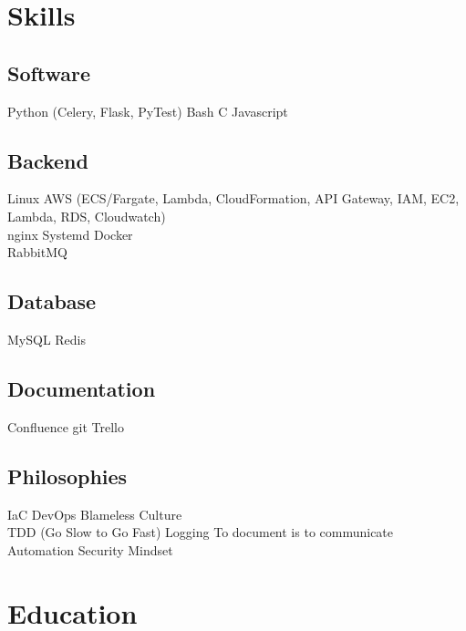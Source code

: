 \documentclass[]{deedy-resume-openfont}
\begin{document}
\begin{minipage}[t]{0.30\textwidth} 


\section{Skills}
\subsection{Software}
Python (Celery, Flask, PyTest) \textbullet{} Bash \textbullet{} C \textbullet{} Javascript 
\\
\subsection{Backend}
Linux \textbullet{} AWS (ECS/Fargate, Lambda, CloudFormation, API Gateway, IAM, EC2, Lambda, RDS, Cloudwatch) \\
\textbullet{} nginx \textbullet{} Systemd \textbullet{} Docker \textbullet{} \\ RabbitMQ
\\
\subsection{Database} 
MySQL \textbullet{} Redis 
\\
\subsection{Documentation}
\textbullet{} Confluence \textbullet{} git \textbullet{} Trello
\\
\subsection{Philosophies}
IaC \textbullet{} DevOps 
\textbullet{} Blameless Culture \\ \textbullet{} TDD (Go Slow to Go Fast) \textbullet{} Logging \textbullet{}
To document is to communicate \textbullet{} \\ Automation \textbullet{} Security Mindset

\sectionsep


\section{Education} 


\end{minipage}
\end{document}
